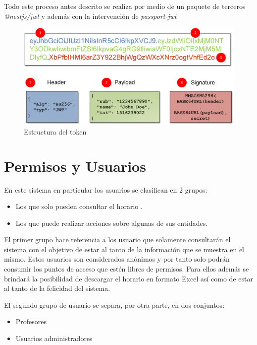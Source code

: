 Todo este proceso antes descrito se realiza por medio de un paquete de terceros \textit{@nestjs/jwt} y además con la intervención de \textit{passport-jwt}

\begin{figure}[h!]
	\centering
	\includegraphics[width=0.95\linewidth]{images/Chapter 3/jwt1}
	\caption{Estructura del token}
	\label{fig:jwt}
\end{figure}

\section{Permisos y Usuarios}

En este sistema en particular los usuarios se clasifican en 2 grupos:

\begin{itemize}
	\item Los que solo pueden consultar el horario .
	\item Los que puede realizar acciones sobre algunas de sus entidades.
\end{itemize}

El primer grupo hace referencia a los usuario que solamente consultarán el sistema con el objetivo de estar al tanto de la información que se muestra en el mismo. Estos usuarios son considerados anónimos y por tanto solo podrán consumir los puntos de acceso que estén libres de permisos. Para ellos además se brindará la posibilidad de descargar el horario en formato Excel así como de estar al tanto de la felicidad del sistema.

El segundo grupo de usuario se separa, por otra parte, en dos conjuntos:

\begin{itemize}
	\item Profesores
	\item Usuarios administradores
\end{itemize}


